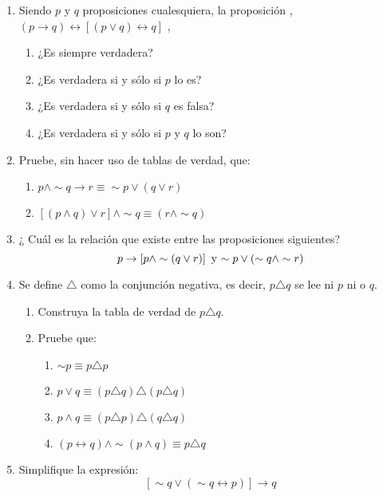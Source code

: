 {\begin{enumerate}
\begin{enumerate}
\item $\left[\left(a\rightarrow b\right)\wedge\left(b\rightarrow c\right)\right]\Rightarrow\left(a\rightarrow c\right)$
\item $\left(a\rightarrow b\right)\Rightarrow\left[\left(c\vee a\right)\rightarrow\left(c\vee b\right)\right]$
\end{enumerate}
\item Siendo $p$ y $q$ proposiciones cualesquiera, la proposición ,$(p\rightarrow q)\leftrightarrow[(p\vee q)\leftrightarrow q]$
, 

\begin{enumerate}
\item ¿Es siempre verdadera?
\item ¿Es verdadera si y sólo si $p$ lo es? 
\item ¿Es verdadera si y sólo si $q$ es falsa? 
\item ¿Es verdadera si y sólo si $p$ y $q$ lo son? 
\end{enumerate}
\item Pruebe, sin hacer uso de tablas de verdad, que: 

\begin{enumerate}
\item $p\wedge\sim q\rightarrow r\equiv\sim p\vee\left(q\vee r\right)$
\item $\left[\left(p\wedge q\right)\vee r\right]\wedge\sim q\equiv\left(r\wedge\sim q\right)$
\end{enumerate}
\item ¿ Cuál es la relación que existe entre las proposiciones siguientes?
\[
p\rightarrow\left[p\wedge\sim\left(q\vee r\right)\right]\mbox{ y \ensuremath{\sim p\vee\left(\sim q\wedge\sim r\right)}}
\]

\item Se define $\triangle$ como la conjunción negativa, es decir, $p\triangle q$
se lee ni $p$ ni o $q$. 

\begin{enumerate}
\item Construya la tabla de verdad de $p\triangle q$.
\item Pruebe que:

\begin{enumerate}
\item $\sim p\equiv p\triangle p$
\item $p\vee q\equiv\left(p\triangle q\right)\triangle\left(p\triangle q\right)$
\item $p\wedge q\equiv\left(p\triangle p\right)\triangle\left(q\triangle q\right)$
\item $\left(p\leftrightarrow q\right)\wedge\sim\left(p\wedge q\right)\equiv p\triangle q$
\end{enumerate}
\end{enumerate}
\item Simplifique la expresión:
\[
\left[\sim q\vee\left(\sim q\leftrightarrow p\right)\right]\rightarrow q
\]


\end{enumerate}}
